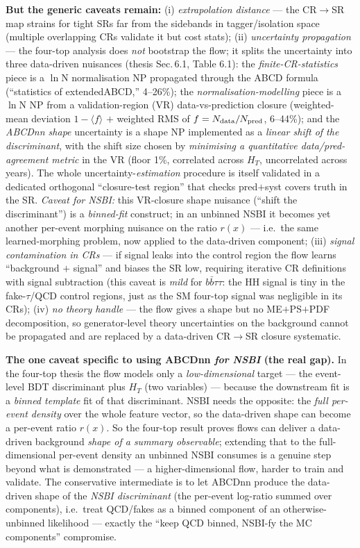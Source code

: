 \documentclass[11pt]{article}
\newcommand{\bbtt}{\ensuremath{b\bar b\tau\tau}}
\begin{document}
\noindent\textbf{But the generic caveats remain:} (i) \emph{extrapolation distance} --- the CR$\to$SR map strains for
tight SRs far from the sidebands in tagger/isolation space (multiple overlapping CRs validate it but cost stats);
(ii) \emph{uncertainty propagation} --- the four-top analysis does \emph{not} bootstrap the flow; it splits the
uncertainty into three data-driven nuisances (thesis Sec.\,6.1, Table 6.1): the \emph{finite-CR-statistics} piece
is a $\ln$N normalisation NP propagated through the ABCD formula (``statistics of extendedABCD,'' 4--26\%); the
\emph{normalisation-modelling} piece is a $\ln$N NP from a validation-region (VR) data-vs-prediction closure
(weighted-mean deviation $1-\langle f\rangle$ $+$ weighted RMS of $f=N_{\rm data}/N_{\rm pred}$, 6--44\%); and the
\emph{ABCDnn shape} uncertainty is a shape NP implemented as a \emph{linear shift of the discriminant}, with the
shift size chosen by \emph{minimising a quantitative data/pred-agreement metric} in the VR (floor 1\%, correlated
across $H_T$, uncorrelated across years). The whole uncertainty-\emph{estimation} procedure is itself validated in a
dedicated orthogonal ``closure-test region'' that checks pred$+$syst covers truth in the SR. \emph{Caveat for NSBI:}
this VR-closure shape nuisance (``shift the discriminant'') is a \emph{binned-fit} construct; in an unbinned NSBI it
becomes yet another per-event morphing nuisance on the ratio $r(x)$ --- i.e.\ the same learned-morphing problem,
now applied to the data-driven component; (iii) \emph{signal contamination in CRs}
--- if signal leaks into the control region the flow learns ``background $+$ signal'' and biases the SR low,
requiring iterative CR definitions with signal subtraction (this caveat is \emph{mild} for \bbtt: the HH signal
is tiny in the fake-$\tau$/QCD control regions, just as the SM four-top signal was negligible in its CRs); (iv) \emph{no theory handle} --- the flow gives a shape
but no ME$+$PS$+$PDF decomposition, so generator-level theory uncertainties on the background cannot be propagated
and are replaced by a data-driven CR$\to$SR closure systematic.

\noindent\textbf{The one caveat specific to using ABCDnn \emph{for NSBI} (the real gap).} In the four-top thesis
the flow models only a \emph{low-dimensional} target --- the event-level BDT discriminant plus $H_T$ (two
variables) --- because the downstream fit is a \emph{binned template} fit of that discriminant. NSBI needs the
opposite: the \emph{full per-event density} over the whole feature vector, so the data-driven shape can become a
per-event ratio $r(x)$. So the four-top result proves flows can deliver a data-driven background \emph{shape of a
summary observable}; extending that to the full-dimensional per-event density an unbinned NSBI consumes is a genuine
step beyond what is demonstrated --- a higher-dimensional flow, harder to train and validate. The conservative
intermediate is to let ABCDnn produce the data-driven shape of the \emph{NSBI discriminant} (the per-event
log-ratio summed over components), i.e.\ treat QCD/fakes as a binned component of an otherwise-unbinned likelihood
--- exactly the ``keep QCD binned, NSBI-fy the MC components'' compromise.
\end{document}
